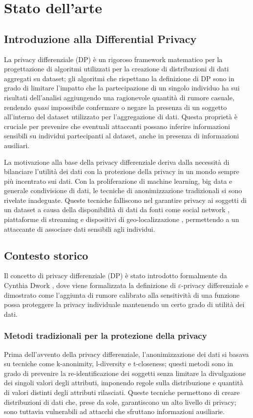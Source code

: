 \chapter{Stato dell'arte}

\section{Introduzione alla Differential Privacy}
La privacy differenziale (DP) è un rigoroso framework matematico per la progettazione di algoritmi utilizzati per la creazione di distribuzioni di dati aggregati su dataset; gli algoritmi che rispettano la definizione di DP sono in grado di limitare l'impatto che la partecipazione di un singolo individuo ha sui risultati dell'analisi aggiungendo una ragionevole quantità di rumore casuale, rendendo \textit{quasi} impossibile confermare o negare la presenza di un soggetto all'interno del dataset utilizzato per l'aggregazione di dati. Questa proprietà è cruciale per prevenire che eventuali attaccanti possano inferire informazioni sensibili su individui partecipanti al dataset, anche in presenza di informazioni ausiliari.

La motivazione alla base della privacy differenziale deriva dalla necessità di bilanciare l'utilità dei dati con la protezione della privacy in un mondo sempre più incentrato sui dati. Con la proliferazione di machine learning, big data e generale condivisione di dati, le tecniche di anonimizzazione tradizionali si sono rivelate inadeguate. Queste tecniche falliscono nel garantire privacy ai soggetti di un dataset a causa della disponibilità di dati da fonti come social network \cite{deanon-socialnet}, piattaforme di streaming \cite{deanon-netflix} e dispositivi di geo-localizzazione \cite{deanon-geodata}, permettendo a un attaccante di associare dati sensibili agli individui.

\section{Contesto storico}
Il concetto di privacy differenziale (DP) è stato introdotto formalmente da Cynthia Dwork \cite{10.1007/11681878_14}, dove viene formalizzata la definizione di $\varepsilon$-privacy differenziale e dimostrato come l'aggiunta di rumore calibrato alla sensitività di una funzione possa proteggere la privacy individuale mantenendo un certo grado di utilità dei dati.

\subsection{Metodi tradizionali per la protezione della privacy}
Prima dell'avvento della privacy differenziale, l'anonimizzazione dei dati si basava su tecniche come k-anonimity, l-diversity e t-closeness; questi metodi sono in grado di prevenire la re-identificazione dei soggetti senza limitare la divulgazione dei singoli valori degli attributi, imponendo regole sulla distribuzione e quantità di valori distinti degli attributi rilasciati. Queste tecniche permettono di creare distribuzioni di dati che, prese da sole, garantiscono un alto livello di privacy; sono tuttavia vulnerabili ad attacchi che sfruttano informazioni ausiliarie.

